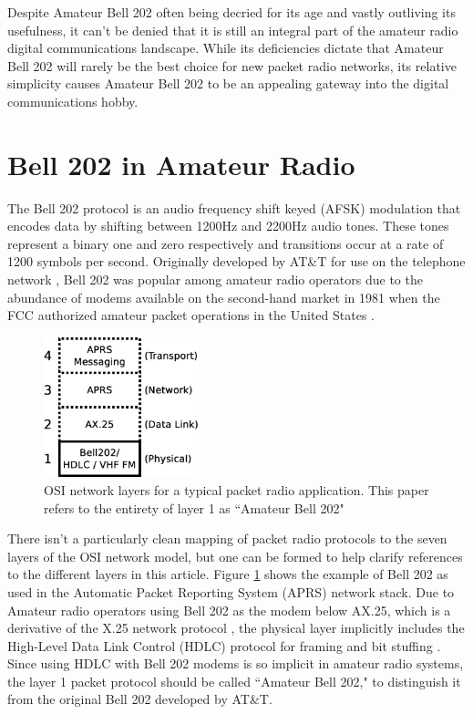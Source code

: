 \documentclass[12pt,letterpaper]{article}
\begin{document}
Despite Amateur Bell 202 often being decried for its age and 
vastly outliving its usefulness,
it can't be denied that it is still an integral part of the amateur radio
digital communications landscape.
While its deficiencies dictate that Amateur Bell 202 will rarely be the best
choice for new packet radio networks, 
its relative simplicity causes
Amateur Bell 202 to be an appealing gateway into the digital communications hobby.
		

\section{Bell 202 in Amateur Radio}
\label{sec:bell202history}

The Bell 202 protocol is an audio frequency shift keyed (AFSK) modulation that
encodes data by shifting between 1200Hz and 2200Hz audio tones.
These tones represent a binary one and zero respectively and transitions occur
at a rate of 1200 symbols per second.
Originally developed by AT\&T for use on the telephone network \cite{202tspec},
Bell 202 was popular among amateur radio operators due to the abundance
of modems available on the second-hand market in 1981 when the FCC authorized
amateur packet operations in the United States \cite{gatewaypacket}.

\begin{figure}[!b]
	\centering
	\includegraphics[width=0.4\textwidth]{src/dia/osi_bell202}
	\caption{OSI network layers for a typical packet radio application. 
	This paper refers to the entirety of layer 1 as ``Amateur Bell 202"}
	\label{fig:osibell}
\end{figure}

There isn't a particularly clean
mapping of packet radio protocols to the seven layers of the OSI
network model, but one can be formed 
to help clarify references to the different layers in this article.
Figure \ref{fig:osibell} shows the example of Bell 202 as used in the 
Automatic Packet Reporting System (APRS) network stack.
Due to Amateur radio operators
using Bell 202 as the modem below AX.25, which is a derivative of
the X.25 network protocol \cite[\S1.1]{ax25spec}, 
the physical layer implicitly includes the High-Level Data Link Control (HDLC) 
protocol for framing and bit stuffing \cite{n1vgphy}.
Since using HDLC with Bell 202 modems is so implicit in amateur radio systems, 
the layer 1 packet protocol should be called ``Amateur Bell 202," to
distinguish it from the original Bell 202 developed by AT\&T.
\end{document}
